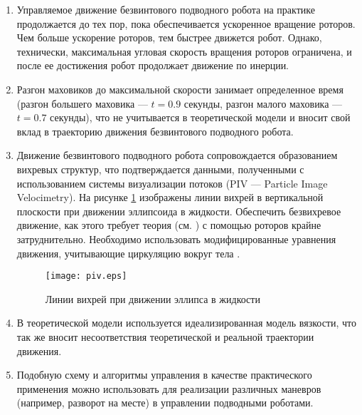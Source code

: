 \begin{enumerate}
	\item	Управляемое движение безвинтового подводного робота на практике продолжается до тех пор, пока обеспечивается ускоренное вращение роторов. Чем больше ускорение роторов, тем быстрее движется робот. Однако, технически, максимальная угловая скорость вращения роторов ограничена, и после ее достижения робот продолжает движение по инерции.
	\item Разгон маховиков до максимальной скорости занимает определенное время (разгон большего маховика --- $t=0.9$ секунды, разгон малого маховика --- $t=0.7$ секунды), что не учитывается в теоретической модели и вносит свой вклад в траекторию движения безвинтового подводного робота.
	\item	Движение безвинтового подводного робота сопровождается образованием вихревых структур, что подтверждается данными, полученными с использованием системы визуализации потоков (PIV --- Particle Image Velocimetry). На рисунке \ref{piv} изображены линии вихрей в вертикальной плоскости при движении эллипсоида в жидкости. Обеспечить безвихревое движение, как этого требует теория (см. \cite{Vetchanin_Mamaev_Tenenev_RCD_2013, Ramodanov_Tenenev_Treschev_RCD_2012}) с помощью роторов крайне затруднительно. Необходимо использовать модифицированные уравнения движения, учитывающие циркуляцию вокруг тела \cite{Kilin_Vetchanin_DAN_2016}.
	
	\begin{figure}[h!]
		\begin{center}
			\texttt{[image: piv.eps]}
			\caption{Линии вихрей при движении эллипса в жидкости} \label{piv}
		\end{center}
	\end{figure}
	
	\item В теоретической модели используется идеализированная модель вязкости, что так же вносит несоответствия теоретической и реальной траектории движения.
	\item Подобную схему и алгоритмы управления в качестве практического применения можно использовать для реализации различных маневров (например, разворот на месте) в управлении подводными роботами.

\end{enumerate}


	
	
\clearpage
